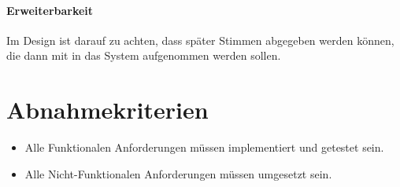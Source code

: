 \documentclass[11pt,a4paper]{scrartcl}
\begin{document}
\paragraph{Erweiterbarkeit}
Im Design ist darauf zu achten, dass später Stimmen abgegeben werden können, die dann mit in das System aufgenommen werden sollen.
\section{Abnahmekriterien}
\begin{itemize}
\item Alle Funktionalen Anforderungen müssen implementiert und getestet sein.
\item Alle Nicht-Funktionalen Anforderungen müssen umgesetzt sein.
\end{itemize}
\end{document}
